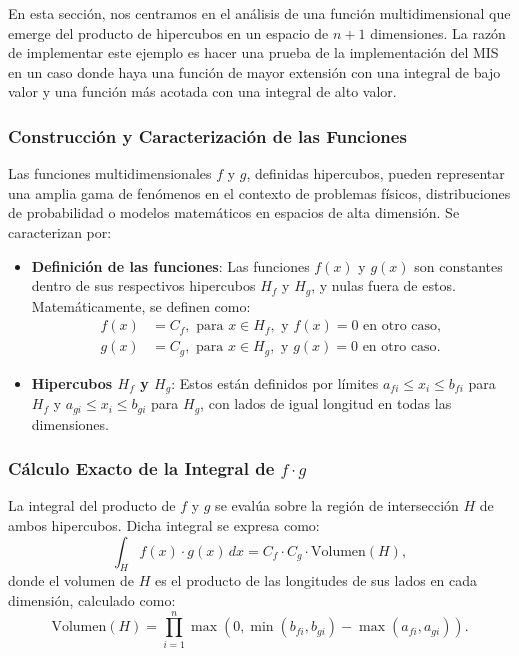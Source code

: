\documentclass{article}
\begin{document}
En esta sección, nos centramos en el análisis de una función multidimensional que emerge del producto de hipercubos en un espacio de \( n + 1 \) dimensiones.
La razón de implementar este ejemplo es hacer una prueba de la implementación del MIS en un caso donde haya una función de mayor extensión con una integral de bajo valor y una función más acotada con una integral de alto valor.

\subsubsection{Construcción y Caracterización de las Funciones}
Las funciones multidimensionales \( f \) y \( g \), definidas hipercubos, pueden representar una amplia gama de fenómenos en el contexto de problemas físicos, distribuciones de probabilidad o modelos matemáticos en espacios de alta dimensión. Se caracterizan por:

\begin{itemize}
    \item \textbf{Definición de las funciones}: Las funciones \( f(x) \) y \( g(x) \) son constantes dentro de sus respectivos hipercubos \( H_f \) y \( H_g \), y nulas fuera de estos. Matemáticamente, se definen como:
    \begin{align*}
        f(x) &= C_f, \text{ para } x \in H_f, \text{ y } f(x) = 0 \text{ en otro caso}, \\
        g(x) &= C_g, \text{ para } x \in H_g, \text{ y } g(x) = 0 \text{ en otro caso}.
    \end{align*}
    \item \textbf{Hipercubos \( H_f \) y \( H_g \)}: Estos están definidos por límites \( a_{fi} \leq x_i \leq b_{fi} \) para \( H_f \) y \( a_{gi} \leq x_i \leq b_{gi} \) para \( H_g \), con lados de igual longitud en todas las dimensiones.
\end{itemize}

\subsubsection{Cálculo Exacto de la Integral de \( f \cdot g \)}
La integral del producto de \( f \) y \( g \) se evalúa sobre la región de intersección \( H \) de ambos hipercubos. Dicha integral se expresa como:
\begin{equation*}
    \int_{H} f(x) \cdot g(x) \, dx = C_f \cdot C_g \cdot \text{Volumen}(H),
\end{equation*}
donde el volumen de \( H \) es el producto de las longitudes de sus lados en cada dimensión, calculado como:
\begin{equation*}
    \text{Volumen}(H) = \prod_{i=1}^{n} \max(0, \min(b_{fi}, b_{gi}) - \max(a_{fi}, a_{gi})).
\end{equation*}
\end{document}
